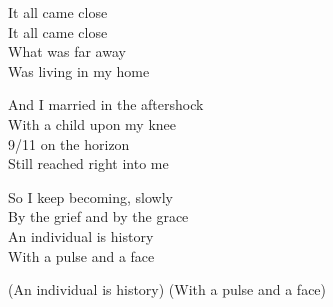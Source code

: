 \begin{lyrics}
It all came close\\
It all came close\\
What was far away\\
Was living in my home

And I married in the aftershock\\
With a child upon my knee\\
9/11 on the horizon\\
Still reached right into me

So I keep becoming, slowly\\
By the grief and by the grace\\
An individual is history\\
With a pulse and a face

(An individual is history)
(With a pulse and a face)
\end{lyrics}

